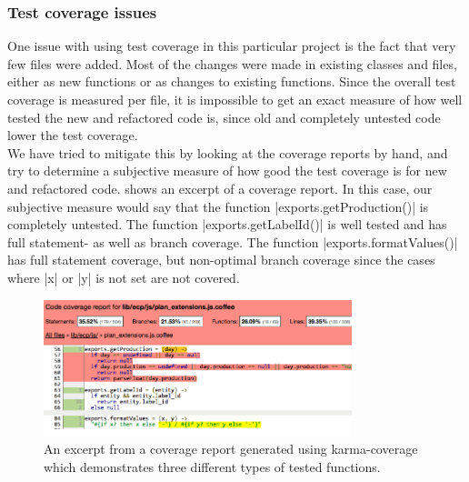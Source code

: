 \subsubsection{Test coverage issues}

One issue with using test coverage in this particular project is the
fact that very few files were added. Most of the changes were made in
existing classes and files, either as new functions or as changes to
existing functions. Since the overall test coverage is measured per
file, it is impossible to get an exact measure of how well tested the
new and refactored code is, since old and completely untested code
lower the test coverage.\\

We have tried to mitigate this by looking at the coverage reports by
hand, and try to determine a subjective measure of how good the test
coverage is for new and refactored code. 
shows an excerpt of a coverage report. In this case, our subjective
measure would say that the function |exports.getProduction()| is
completely untested. The function |exports.getLabelId()| is well tested
and has full statement- as well as branch coverage. The function
|exports.formatValues()| has full statement coverage, but non-optimal
branch coverage since the cases where |x| or |y| is not set are not
covered.\\

\begin{figure}
\centering
\includegraphics[width=0.8\textwidth]{results/choices/js_coverage}
\caption{An excerpt from a coverage report generated using karma-coverage
         which demonstrates three different types of tested functions.}
\label{fig:coverage_example}
\end{figure}
